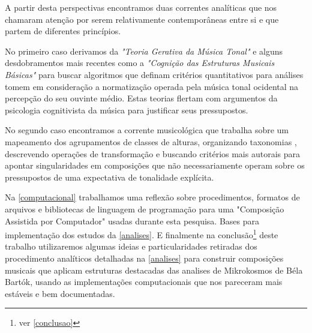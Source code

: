 \documentclass[
	12pt,				%
	openright,			%
	twoside,			%
	a4paper,			%
	english,			%
	french,				%
	spanish,			%
	brazil				%
	]{abntex2}
\begin{document}
A partir desta perspectivas encontramos duas correntes analíticas que nos chamaram atenção por serem relativamente contemporâneas entre si e que partem de diferentes princípios. 

No primeiro caso derivamos da \textit{"Teoria Gerativa da Música Tonal"}\cite{lerdahl1983generative} e alguns desdobramentos mais recentes como a \textit{"Cognição das Estruturas Musicais Básicas"}\cite{temperley2004cognition} para buscar algoritmos que definam critérios quantitativos para análises tomem em consideração a normatização operada pela música tonal ocidental na percepção do seu ouvinte médio. Estas teorias flertam com argumentos da psicologia cognitivista da música\cite{krumhansl1990cognitive} para justificar seus pressupostos.

No segundo caso encontramos a corrente musicológica que trabalha sobre um mapeamento dos agrupamentos de classes de alturas, organizando taxonomias \cite{forte1973structure}, descrevendo operações de transformação\cite{straus2004} e buscando critérios mais autorais para apontar singularidades em composições\cite{lester1989analytic,straus2004} que não necessariamente operam sobre os pressupostos de uma expectativa de tonalidade explícita.

Na \autoref{computacional} trabalhamos uma reflexão sobre procedimentos, formatos de arquivos e bibliotecas de linguagem de programação para uma "Composição Assistida por Computador" usadas durante esta pesquisa. Bases para implementação dos estudos da \autoref{analises}.
\linebreak
\linebreak
\linebreak
E finalmente na conclusão\footnote{ ver \autoref{conclusao}} deste trabalho utilizaremos algumas ideias e particularidades retiradas dos procedimento analíticos detalhadas na \autoref{analises} para construir composições musicais que aplicam estruturas destacadas das analises de Mikrokosmos de Béla Bartók, usando as implementações computacionais que nos pareceram mais estáveis e bem documentadas.
\end{document}
